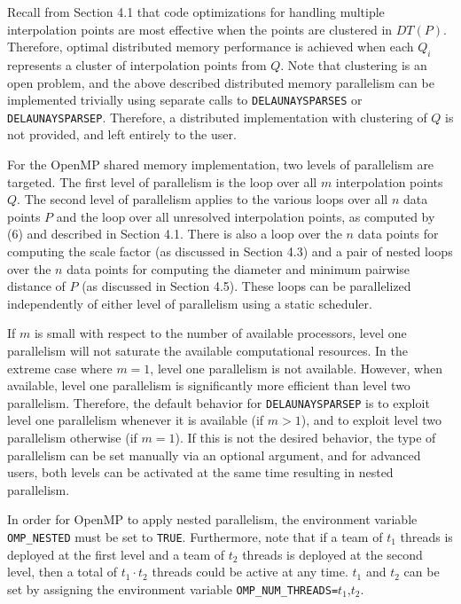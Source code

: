 \enspace
Recall from Section 4.1 that code optimizations for handling multiple
interpolation points are most effective when the points are clustered
in $DT(P)$. Therefore, optimal distributed memory performance is achieved
when each $Q_i$ represents a cluster of interpolation points from $Q$.
Note that clustering is an open problem, and the above described
distributed memory parallelism can be implemented trivially using separate
calls to {\tt DELAUNAYSPARSES} or {\tt DELAUNAYSPARSEP}. Therefore, a
distributed implementation with clustering of $Q$ is not provided, and
left entirely to the user.
\medskip

For the OpenMP shared memory implementation, two levels of parallelism
are targeted. The first level of parallelism is the loop over all $m$
interpolation points $Q$. The second level of parallelism applies to
the various loops over all $n$ data points $P$ and the loop over all
unresolved interpolation points, as computed by (6) and described in
Section 4.1.
There is also a loop over the $n$ data points for computing the scale
factor (as discussed in Section 4.3) and a pair of nested loops over
the $n$ data points for computing the diameter and minimum pairwise
distance of $P$ (as discussed in Section 4.5).
These loops can be parallelized independently of either level of
parallelism using a static scheduler.

If $m$ is small with respect to the number of available processors,
level one parallelism will not saturate the available computational
resources. In the extreme case where $m=1$, level one parallelism is
not available. However, when available, level one parallelism is
significantly more efficient than level two parallelism. Therefore, the
default behavior for {\tt DELAUNAYSPARSEP} is to exploit level one
parallelism whenever it is available (if $m > 1$), and to exploit level
two parallelism otherwise (if $m = 1$). If this is not the desired
behavior, the type of parallelism can be set manually via an optional
argument, and for advanced
users, both levels can be activated at the same time resulting in
nested parallelism.

\enspace
In order for OpenMP to apply nested parallelism, the environment variable
{\tt OMP\_NESTED} must be set to {\tt TRUE}. Furthermore, note that if
a team of $t_1$ threads is deployed at the first level and a team of $t_2$
threads is deployed at the second level, then a total of $t_1 \cdot t_2$
threads could be active at any time. $t_1$ and $t_2$ can be set by
assigning the environment variable {\tt OMP\_NUM\_THREADS=}$t_1$,$t_2$.
\medskip

